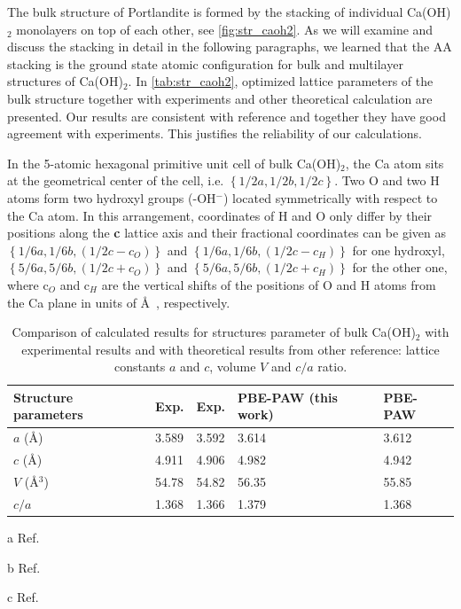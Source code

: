 The bulk structure of Portlandite is formed by the stacking of individual Ca(OH)$_2$ monolayers on top of each other, see \autoref{fig:str_caoh2}. As we will examine and discuss the stacking in detail in the following paragraphs, we learned that the AA stacking is the ground state atomic configuration for bulk and multilayer structures of Ca(OH)$_2$. In \autoref{tab:str_caoh2}, optimized lattice parameters of the bulk structure together with experiments and other theoretical calculation are presented. Our results are consistent with reference \cite{Pishtshev} and together they have good agreement with experiments. This justifies the reliability of our calculations. 

In the 5-atomic hexagonal primitive unit cell of bulk Ca(OH)$_2$, the Ca atom sits at the geometrical
center of the cell, i.e. $\left\lbrace 1/2a, 1/2b,
1/2c \right\rbrace$. Two O and two H atoms form two hydroxyl groups 
(-OH$^-$) located symmetrically with respect to the Ca atom. In this 
arrangement, coordinates of H and O only differ by their positions along the 
\textbf{c} lattice axis and their fractional coordinates can be given as
$\left\lbrace1/6a, 1/6b, (1/2c-c_O) \right\rbrace$ and $\left\lbrace 
1/6a, 1/6b, (1/2c-c_H) \right\rbrace$ for one hydroxyl,
$\left\lbrace 5/6a, 5/6b, (1/2c+c_O) \right\rbrace$
and $\left\lbrace 5/6a, 5/6b, (1/2c+c_H)
\right\rbrace$ for the other one, where c$_O$ and c$_H$ are the vertical shifts
of the positions of O and H atoms from the Ca plane in units of \AA~, respectively. 

\begin{table}
\centering
\caption{\label{tab:str_caoh2}
Comparison of calculated results for structures parameter of bulk Ca(OH)$_2$ with experimental results and with theoretical results from other reference: lattice constants 
$a$ and $c$, volume $V$ and $c/a$ ratio. }
\begin{threeparttable}
\begin{tabularx}{0.92\linewidth}{X|XXXX}
\hline\hline
Structure parameters & Exp. \tnote{a} & Exp. \tnote{b} & PBE-PAW (this work) & PBE-PAW \tnote{c}  \\
\hline

$a$ (\AA)                   & 3.589 & 3.592 & 3.614 & 3.612 \\
$c$ (\AA)                   & 4.911 & 4.906 & 4.982 & 4.942 \\
$V$ (\AA$^3$)               & 54.78 & 54.82 & 56.35 & 55.85 \\
$c/a$                       & 1.368 & 1.366 & 1.379 & 1.368 \\

\hline\hline

\end{tabularx}
\begin{tablenotes}
\begin{footnotesize}
\item[a]Ref. \cite{exp.1}
\item[b]Ref. \cite{exp.2}
\item[c]Ref. \cite{Pishtshev}
\end{footnotesize}
\end{tablenotes}
\end{threeparttable}
\end{table}

